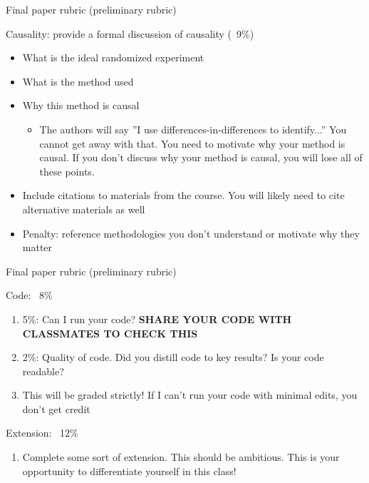 \documentclass[compress, 8pt]{beamer}
\begin{document}
\begin{frame}{Final paper rubric (preliminary rubric)}


Causality: provide a formal discussion of causality (~9\%)
\begin{itemize}
    \item What is the ideal randomized experiment
    \item What is the method used
    \item Why this method is causal
    \begin{itemize}
         \item The authors will say ”I use differences-in-differences to identify...” You cannot get away with that. You need to motivate why your method is causal. If you don't discuss why your method is causal, you will lose all of these points. 
     \end{itemize} 
    \item Include citations to materials from the course. You will likely need to cite alternative materials as well
    \item Penalty: reference methodologies you don't understand or motivate why they matter
\end{itemize}

\end{frame}

\begin{frame}{Final paper rubric (preliminary rubric)}

Code: ~8\%
\begin{enumerate}
    \item 5\%: Can I run your code? \textbf{SHARE YOUR CODE WITH CLASSMATES TO CHECK THIS}
    \item 2\%: Quality of code. Did you distill code to key results? Is your code readable? 
    \item This will be graded strictly! If I can't run your code with minimal edits, you don't get credit
\end{enumerate}

Extension: ~12\%
\begin{enumerate}
    \item Complete some sort of extension. This should be ambitious. This is your opportunity to differentiate yourself in this class!
\end{enumerate}

\end{frame}
\end{document}
